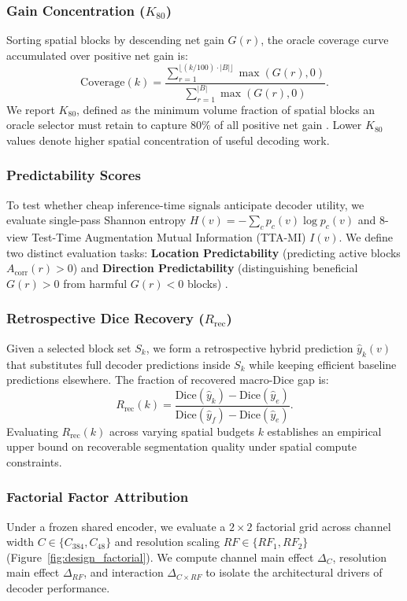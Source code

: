 \subsubsection{Gain Concentration ($K_{80}$)}
\label{sec:k80}
Sorting spatial blocks by descending net gain $G(r)$, the oracle coverage curve accumulated over positive net gain is:
\begin{equation}
\mathrm{Coverage}(k) = \frac{\sum_{r=1}^{\lfloor (k/100) \cdot |B| \rfloor} \max(G(r), 0)}{\sum_{r=1}^{|B|} \max(G(r), 0)} .
\end{equation}
We report $K_{80}$, defined as the minimum volume fraction of spatial blocks an oracle selector must retain to capture $80\%$ of all positive net gain \cite{geifman2017selective}. Lower $K_{80}$ values denote higher spatial concentration of useful decoding work.

\subsubsection{Predictability Scores}
\label{sec:predictability}
To test whether cheap inference-time signals anticipate decoder utility, we evaluate single-pass Shannon entropy $H(v) = -\sum_{c} p_c(v) \log p_c(v)$ \cite{shannon1948mathematical,gal2016dropout,guo2017calibration} and $8$-view Test-Time Augmentation Mutual Information (TTA-MI) $I(v)$. We define two distinct evaluation tasks: \textbf{Location Predictability} (predicting active blocks $A_{\text{corr}}(r) > 0$) and \textbf{Direction Predictability} (distinguishing beneficial $G(r)>0$ from harmful $G(r)<0$ blocks) \cite{cmig2025quality}.

\subsubsection{Retrospective Dice Recovery ($R_{\text{rec}}$)}
\label{sec:recovery}
Given a selected block set $S_k$, we form a retrospective hybrid prediction $\hat{y}_k(v)$ that substitutes full decoder predictions inside $S_k$ while keeping efficient baseline predictions elsewhere. The fraction of recovered macro-Dice gap is:
\begin{equation}
R_{\text{rec}}(k) = \frac{\text{Dice}(\hat{y}_k) - \text{Dice}(\hat{y}_e)}{\text{Dice}(\hat{y}_f) - \text{Dice}(\hat{y}_e)} .
\end{equation}
Evaluating $R_{\text{rec}}(k)$ across varying spatial budgets $k$ establishes an empirical upper bound on recoverable segmentation quality under spatial compute constraints.

\subsubsection{Factorial Factor Attribution}
\label{sec:factorial}
Under a frozen shared encoder, we evaluate a $2\times2$ factorial grid across channel width $C \in \{C_{384}, C_{48}\}$ and resolution scaling $RF \in \{RF_1, RF_2\}$ (Figure~\ref{fig:design_factorial}). We compute channel main effect $\Delta_C$, resolution main effect $\Delta_{RF}$, and interaction $\Delta_{C \times RF}$ to isolate the architectural drivers of decoder performance.
